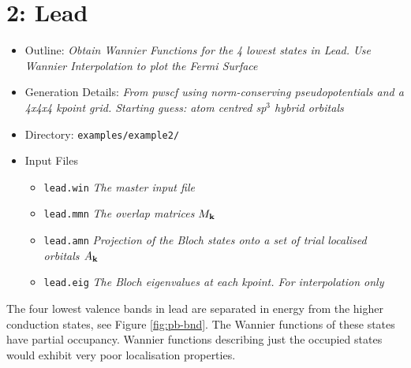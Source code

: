 \documentclass[a4paper,11pt,twoside]{article}
\begin{document}
\cleardoublepage



\section*{2: Lead}

\begin{itemize}
\item{Outline: \it{Obtain Wannier Functions for the 4 lowest states in Lead. Use Wannier
Interpolation to plot the Fermi Surface}}
\item{Generation Details: \it{From pwscf using norm-conserving pseudopotentials
and a 4x4x4 kpoint grid. Starting guess: atom centred sp$^3$ hybrid orbitals}}
\item{Directory: {\tt examples/example2/}}
\item{Input Files}
\begin{itemize}
\item{ {\tt lead.win}  {\it The master input file}}
\item{ {\tt lead.mmn}  {\it The overlap matrices $M_{{\bf k}}$}}
\item{ {\tt lead.amn}  {\it Projection of the Bloch states onto a set of trial localised orbitals $A_{{\bf k}}$}}
\item{ {\tt lead.eig}  {\it The Bloch eigenvalues at each kpoint. For interpolation only}}
\end{itemize}

\end{itemize}
The four lowest valence bands in lead are separated in energy from the
higher conduction states, see Figure \ref{fig:pb-bnd}. The Wannier
functions of these states have partial occupancy. Wannier functions
describing just the occupied states would exhibit very poor localisation
properties. 
\end{document}
